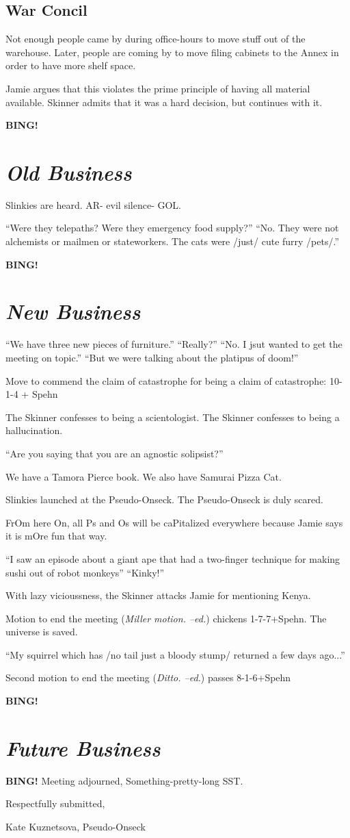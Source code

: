 \documentclass[10pt]{article}
\newcommand{\bing}{{\bf BING!} }
\newcommand{\goto}[1]{\bing \vskip 12pt \section*{{\em{#1}}}}
\begin{document}

\subsection*{War Concil}
Not enough people came by during office-hours to move stuff out of the warehouse. Later, people are coming by to move filing cabinets to the Annex in order to have more shelf space.

Jamie argues that this violates the prime principle of having all material available. Skinner admits that it was a hard decision, but continues with it.
 





\goto{Old Business}

Slinkies are heard.
AR- evil silence- GOL.

``Were they telepaths? Were they emergency food supply?''
``No. They were not alchemists or mailmen or stateworkers. The cats were /just/ cute furry /pets/.''

\goto{New Business}

``We have three new pieces of furniture.''
``Really?''
``No. I jsut wanted to get the meeting on topic.''
``But we were talking about the platipus of doom!''

Move to commend the claim of catastrophe for being a claim of catastrophe: 10-1-4 + Spehn

The Skinner confesses to being a scientologist. The Skinner confesses to being a hallucination. 

``Are you saying that you are an agnostic solipsist?''

We have a Tamora Pierce book. We also have Samurai Pizza Cat.

Slinkies launched at the Pseudo-Onseck. The Pseudo-Onseck is duly scared. 

FrOm here On, all Ps and Os will be caPitalized everywhere because Jamie says it is mOre fun that way.

``I saw an episode about a giant ape that had a two-finger technique for making sushi out of robot monkeys''
``Kinky!''

With lazy vicioussness, the Skinner attacks Jamie for mentioning Kenya.

Motion to end the meeting (\emph{Miller motion. --ed.}) chickens 1-7-7+Spehn. The universe is saved.

``My squirrel which has /no tail just a bloody stump/ returned a few days ago...''

Second motion to end the meeting (\emph{Ditto. --ed.}) passes 8-1-6+Spehn

\goto{Future Business}

\bing
\noindent
Meeting adjourned, Something-pretty-long SST.

\vspace{18pt}

\centerline{Respectfully submitted,}
\centerline{Kate Kuznetsova, Pseudo-Onseck}
\end{document}
